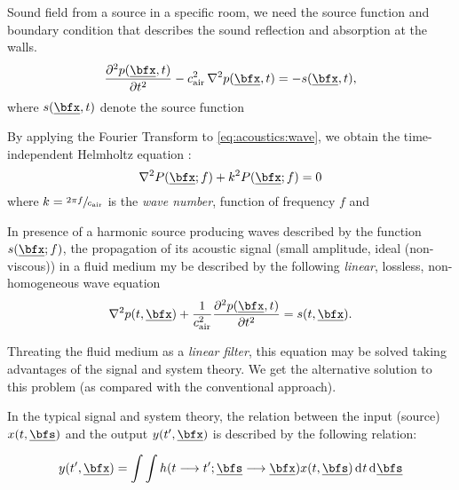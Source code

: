 Sound field from a source in a specific room, we need the source function and boundary condition that describes the sound reflection and absorption at the walls.
\begin{equation}
    \label{eq:acoustics:wave}
    \kpderiv[2]{\pressure(\positionMicrophone, t)}{t} - \cair^2 \knabla^2 \pressure(\positionMicrophone, t) = - \contSource(\positionMicrophone, t)
    ,
\end{equation}
where $\contSource(\positionMicrophone, t)$ denote the source function \cite{Room Impulse Response Generator, Habets}

By applying the Fourier Transform to \cref{eq:acoustics:wave}, we obtain the time-independent Helmholtz equation
:
\begin{equation}
    \knabla^2 P(\positionMicrophone ; f) + k^2 P(\positionMicrophone ; f) = 0
\end{equation}
where $k = \sfrac{2 \pi f}{c_\text{air}}$ is the \textit{wave number}, function of frequency $f$ and


In presence of a harmonic source producing waves described by the function $s(\positionMicrophone ; f)$, the propagation of its acoustic
signal (small amplitude, ideal (non-viscous)) in a fluid medium my be described by the following \textit{linear}, lossless, non-homogeneous wave equation
\begin{equation}
    \label{eq:acoustics:helmholtzSource}
    \knabla^2 p(t, \positionMicrophone) + \frac{1}{\cair^2} \kpderiv[2]{\pressure(\positionMicrophone, t)}{t} = s(t, \positionMicrophone).
\end{equation}

Threating the fluid medium as a \textit{linear filter}, this equation may be solved taking advantages of the signal and system theory.
We get the alternative solution to this problem (as compared with the conventional approach).

In the typical signal and system theory, the relation between the input (source) $x(t, \positionSource)$ and
the output $y(t', \positionMicrophone)$ is described by the following relation:

\begin{equation}
    \label{eq:acoustics:lti}
    y(t', \positionMicrophone) =
    \int \int
        h(t \kto  t' ; \positionSource \kto \positionMicrophone)
        x(t, \positionSource)
        \kdiff t  \kdiff \positionSource
\end{equation}

